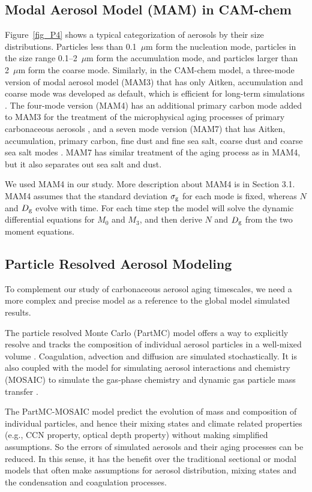 \documentclass[12pt, fullpage]{uiucthesis2009}
\begin{document}
		\subsection{Modal Aerosol Model (MAM) in CAM-chem}
		Figure~\ref{fig_P4} shows a typical categorization of aerosols by their size distributions. Particles less than 0.1~$\mu$m form the nucleation mode, particles in the size range 0.1--2~$\mu$m form the accumulation mode, and particles larger than 2~$\mu$m form the coarse mode. Similarly, in the CAM-chem model, a three-mode version of modal aerosol model (MAM3) that has only Aitken, accumulation and coarse mode was developed as default, which is efficient for long-term simulations \citep{Liu2012}. The four-mode version (MAM4) has an additional primary carbon mode added to MAM3 for the treatment of the microphysical aging processes of primary carbonaceous aerosols \citep{Liu2016}, and a seven mode version (MAM7) that has Aitken, accumulation, primary carbon, fine dust and fine sea salt, coarse dust and coarse sea salt modes \citep{Liu2012}. MAM7 has similar treatment of the aging process as in MAM4, but it also separates out sea salt and dust.
		
		We used MAM4 in our study. More description about MAM4 is in Section 3.1. MAM4 assumes that the standard deviation $\sigma_{\rm g}$ for each mode is fixed, whereas $N$ and $D_{\rm g}$ evolve with time. For each time step the model will solve the dynamic differential equations for $M_0$ and $M_3$, and then derive $N$ and $D_{\rm g}$ from the two moment equations.
		
		\subsection{Particle Resolved Aerosol Modeling}
		To complement our study of carbonaceous aerosol aging timescales, we need a more complex and precise model as a reference to the global model simulated results. 
		
		The particle resolved Monte Carlo (PartMC) model offers a way to explicitly resolve and tracks the composition of individual aerosol particles in a well-mixed volume \citep{riemer2009simulating}. Coagulation, advection and diffusion are simulated stochastically. It is also coupled with the model for simulating aerosol interactions and chemistry (MOSAIC) to simulate the gas-phase chemistry and dynamic gas particle mass transfer \citep{zaveri2008model}. 
		
		The PartMC-MOSAIC model predict the evolution of mass and composition of individual particles, and hence their mixing states and climate related properties (e.g., CCN property, optical depth property) without making simplified assumptions. So the errors of simulated aerosols and their aging processes can be reduced. In this sense, it has the benefit over the traditional sectional or modal models that often make assumptions for aerosol distribution, mixing states and the condensation and coagulation processes.
		
\end{document}
